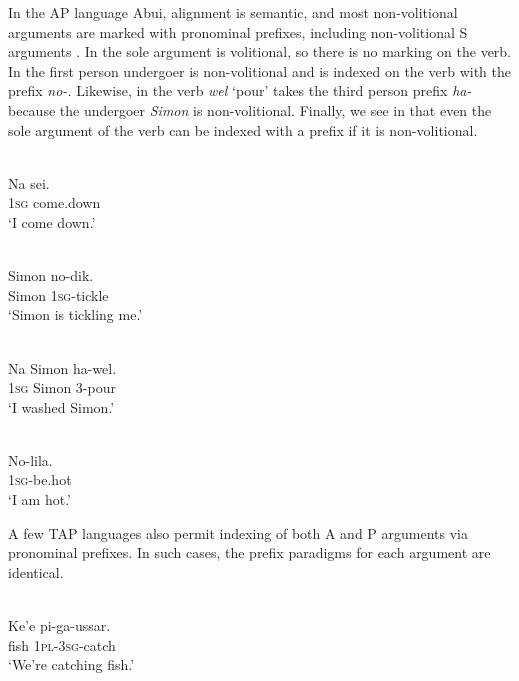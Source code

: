 In the AP language Abui, alignment is semantic, and most non-volitional arguments are marked with pronominal prefixes, including non-volitional S arguments \citep[chapter 10]{FeddenEtAl2013}. In  the sole argument is volitional, so there is no marking on the verb. In  the first person undergoer is non-volitional and is indexed on the verb with the prefix \textit{no-.} Likewise, in  the verb \textit{wel }`pour' takes the third person prefix \textit{ha-} because the undergoer \textit{Simon} is non-volitional. Finally, we see in  that even the sole argument of the verb can be indexed with a prefix if it is non-volitional.

\ea%
\label{ex:4:4}
 \\
\gll  Na sei. \\
  \textsc{1sg} come.down \\
\glt `I come down.'
\z





\ea%
\label{ex:4:5}
 \\
\gll  Simon no-dik. \\
  Simon \textsc{1sg}-tickle  \\
\glt `Simon is tickling me.'
\z





\ea%
\label{ex:4:6}
 \\
\gll  Na Simon ha-wel. \\
  \textsc{1sg} Simon 3-pour  \\
\glt `I washed Simon.'
\z





\ea%
\label{ex:4:7}
 \\
\gll  No-lila. \\
  \textsc{1sg}-be.hot  \\
\glt `I am hot.'
\z





A few TAP languages also permit indexing of both A and P arguments via pronominal prefixes. In such cases, the prefix paradigms for each argument are identical.

\ea%
\label{ex:4:8}
 \\
\gll  Ke'e pi-ga-ussar. \\
   fish \textsc{1pl-3sg}-catch \\
\glt `We're catching fish.'
\z





